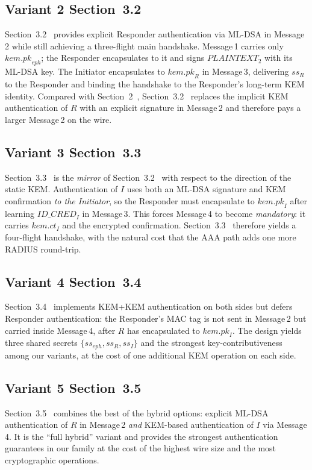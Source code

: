 \documentclass{easychair}
\newcommand{\VarSec}[1]{Section~#1~\cite{pq-edhoc-draft}}
\begin{document}
\subsection{Variant 2 \texorpdfstring{\VarSec{3.2}}{Section 3.2 of the draft}}
\label{sec:variant-s32}
\VarSec{3.2} provides explicit Responder authentication via ML-DSA in
Message\,2 while still achieving a three-flight main handshake.
Message\,1 carries only $\mathit{kem.pk}_{\mathit{eph}}$; the Responder
encapsulates to it and signs $PLAINTEXT_2$ with its ML-DSA key. The
Initiator encapsulates to $\mathit{kem.pk}_R$ in Message\,3, delivering
$\mathit{ss}_R$ to the Responder and binding the handshake to the
Responder's long-term KEM identity. Compared with \VarSec{2},
\VarSec{3.2} replaces the implicit KEM authentication of $R$ with an
explicit signature in Message\,2 and therefore pays a larger Message\,2
on the wire.

\subsection{Variant 3 \texorpdfstring{\VarSec{3.3}}{Section 3.3 of the draft}}
\label{sec:variant-s33}
\VarSec{3.3} is the \emph{mirror} of \VarSec{3.2} with respect to the
direction of the static KEM. Authentication of $I$ uses both an ML-DSA
signature and KEM confirmation \emph{to the Initiator}, so the Responder
must encapsulate to $\mathit{kem.pk}_I$ after learning
$\mathit{ID\_CRED}_I$ in Message\,3. This forces Message\,4 to become
\emph{mandatory}: it carries $\mathit{kem.ct}_I$ and the encrypted
confirmation. \VarSec{3.3} therefore yields a four-flight handshake,
with the natural cost that the AAA path adds one more RADIUS
round-trip.

\subsection{Variant 4 \texorpdfstring{\VarSec{3.4}}{Section 3.4 of the draft}}
\label{sec:variant-s34}
\VarSec{3.4} implements KEM+KEM authentication on both sides but defers
Responder authentication: the Responder's MAC tag is not sent in
Message\,2 but carried inside Message\,4, after $R$ has encapsulated to
$\mathit{kem.pk}_I$. The design yields three shared secrets
$\{\mathit{ss}_{\mathit{eph}},\mathit{ss}_R,\mathit{ss}_I\}$ and the
strongest key-contributiveness among our variants, at the cost of one
additional KEM operation on each side.

\subsection{Variant 5 \texorpdfstring{\VarSec{3.5}}{Section 3.5 of the draft}}
\label{sec:variant-s35}
\VarSec{3.5} combines the best of the hybrid options: explicit ML-DSA
authentication of $R$ in Message\,2 \emph{and} KEM-based authentication
of $I$ via Message\,4. It is the ``full hybrid'' variant and provides
the strongest authentication guarantees in our family at the cost of
the highest wire size and the most cryptographic operations.
\end{document}
